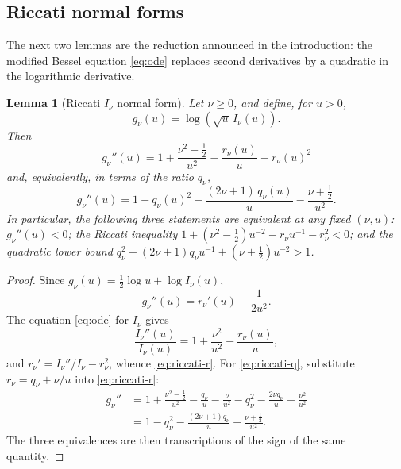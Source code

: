 \documentclass[preprint,12pt]{elsarticle}
\theoremstyle{plain}
\newtheorem{lemma}[theorem]{Lemma}
\theoremstyle{definition}
\theoremstyle{remark}
\begin{document}
\subsection{Riccati normal forms}

The next two lemmas are the reduction announced in the introduction: the
modified Bessel equation \eqref{eq:ode} replaces second derivatives by a
quadratic in the logarithmic derivative.

\begin{lemma}[Riccati \(I_\nu\) normal form]\label{lem:riccati-I}
Let \(\nu\ge0\), and define, for \(u>0\),
\[
g_\nu(u)=\log(\sqrt u\,I_\nu(u)).
\]
Then
\begin{equation}\label{eq:riccati-r}
g_\nu''(u)
=1+\frac{\nu^2-\frac12}{u^2}-\frac{r_\nu(u)}{u}-r_\nu(u)^2
\end{equation}
and, equivalently, in terms of the ratio \(q_\nu\),
\begin{equation}\label{eq:riccati-q}
g_\nu''(u)
=1-q_\nu(u)^2-\frac{(2\nu+1)\,q_\nu(u)}{u}-\frac{\nu+\frac12}{u^2}.
\end{equation}
In particular, the following three statements are equivalent at any fixed
\((\nu,u)\): \(g_\nu''(u)<0\); the Riccati inequality
\(1+(\nu^2-\tfrac12)u^{-2}-r_\nu u^{-1}-r_\nu^2<0\); and the quadratic lower
bound \(q_\nu^2+(2\nu+1)q_\nu u^{-1}+(\nu+\tfrac12)u^{-2}>1\).
\end{lemma}
\begin{proof}
Since \(g_\nu(u)=\tfrac12\log u+\log I_\nu(u)\),
\begin{equation}
g_\nu''(u)=r_\nu'(u)-\frac{1}{2u^2}.
\end{equation}
The equation \eqref{eq:ode} for \(I_\nu\) gives
\begin{equation}
\frac{I_\nu''(u)}{I_\nu(u)}=1+\frac{\nu^2}{u^2}-\frac{r_\nu(u)}{u},
\end{equation}
and \(r_\nu'=I_\nu''/I_\nu-r_\nu^2\), whence \eqref{eq:riccati-r}. For
\eqref{eq:riccati-q}, substitute \(r_\nu=q_\nu+\nu/u\) into
\eqref{eq:riccati-r}:
\begin{equation}
\begin{aligned}
g_\nu''
&=1+\frac{\nu^2-\frac12}{u^2}
-\frac{q_\nu}{u}-\frac{\nu}{u^2}
-q_\nu^2-\frac{2\nu q_\nu}{u}-\frac{\nu^2}{u^2}\\
&=1-q_\nu^2-\frac{(2\nu+1)q_\nu}{u}-\frac{\nu+\frac12}{u^2}.
\end{aligned}
\end{equation}
The three equivalences are then transcriptions of the sign of the same
quantity.
\end{proof}
\end{document}
